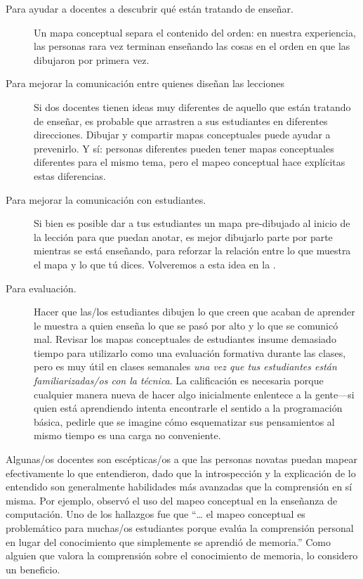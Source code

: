 \begin{description}

\item[Para ayudar a docentes a descubrir qué están tratando de enseñar.]
  Un mapa conceptual separa el contenido del orden:
  en nuestra experiencia,
  las personas rara vez terminan enseñando las cosas en el orden en que las dibujaron por primera vez.

\item[Para mejorar la comunicación entre quienes diseñan las lecciones]
  Si dos docentes tienen ideas muy diferentes de aquello que están tratando de enseñar, es probable que arrastren a sus estudiantes en diferentes direcciones.
  Dibujar y compartir mapas conceptuales puede ayudar a prevenirlo.
  Y sí:
  personas diferentes pueden tener mapas conceptuales diferentes para el mismo tema,
  pero el mapeo conceptual hace explícitas estas diferencias.

\item[Para mejorar la comunicación con estudiantes.]
  Si bien es posible dar a tus estudiantes un mapa pre-dibujado al inicio de la lección para que puedan anotar,
  es mejor dibujarlo parte por parte mientras se está enseñando,
  para reforzar la relación entre lo que muestra el mapa y lo que tú dices.
  Volveremos a esta idea en la .

\item[Para evaluación.]
  Hacer que las/los estudiantes dibujen lo que creen que acaban de aprender
  le muestra a quien enseña lo que se pasó por alto y lo que se comunicó mal.
  Revisar los mapas conceptuales de estudiantes insume demasiado tiempo para utilizarlo como una evaluación formativa durante las clases,
  pero es muy útil en clases semanales \emph{una vez que tus estudiantes están familiarizadas/os con la técnica}.
  La calificación es necesaria porque
  cualquier manera nueva de hacer algo inicialmente enlentece a la gente---si quien está aprendiendo intenta encontrarle el sentido a la programación básica,
  pedirle que se imagine cómo esquematizar sus pensamientos al mismo tiempo es una carga no conveniente.

\end{description}

Algunas/os docentes son escépticas/os a que las personas novatas puedan mapear efectivamente lo que entendieron,
dado que la introspección y la explicación de lo entendido son generalmente habilidades más avanzadas que la comprensión en sí misma.
Por ejemplo,
\cite{Kepp2008} observó el uso del mapeo conceptual en la enseñanza de computación.
Uno de los hallazgos fue que
``{\ldots} el mapeo conceptual es problemático para muchas/os estudiantes porque
evalúa la comprensión personal en lugar del conocimiento que simplemente se aprendió de memoria.''
Como alguien que valora la comprensión sobre el conocimiento de memoria, 
lo considero un beneficio.

